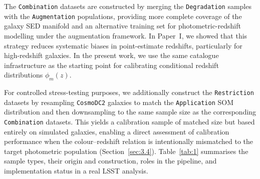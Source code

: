 The \texttt{Combination} datasets are constructed by merging the \texttt{Degradation} samples with the \texttt{Augmentation} populations, providing more complete coverage of the galaxy SED manifold and an alternative training set for photometric-redshift modelling under the augmentation framework. In Paper~I, we showed that this strategy reduces systematic biases in point-estimate redshifts, particularly for high-redshift galaxies. In the present work, we use the same catalogue infrastructure as the starting point for calibrating conditional redshift distributions \(\phi_m(z)\).

For controlled stress-testing purposes, we additionally construct the \texttt{Restriction} datasets by resampling \texttt{CosmoDC2} galaxies to match the \texttt{Application} SOM distribution and then downsampling to the same sample size as the corresponding \texttt{Combination} datasets. This yields a calibration sample of matched size but based entirely on simulated galaxies, enabling a direct assessment of calibration performance when the colour--redshift relation is intentionally mismatched to the target photometric population (Section~\ref{sec:3.4}). Table~\ref{tab:1} summarises the sample types, their origin and construction, roles in the pipeline, and implementation status in a real LSST analysis.


